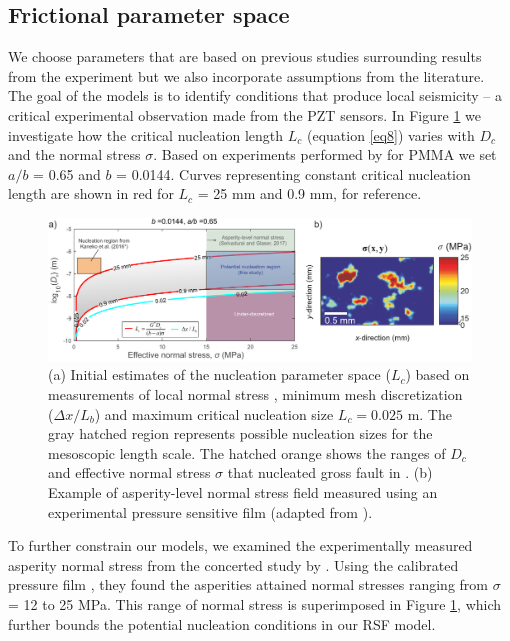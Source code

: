 \documentclass[preprint,1p, 10pt,authoryear]{elsarticle}
\begin{document}
\subsection{Frictional parameter space}
\label{ParameterSpace}
We choose parameters that are based on previous studies surrounding results from the experiment but we also incorporate assumptions from the literature. The goal of the models is to identify conditions that produce local seismicity -- a critical experimental observation made from the PZT sensors. In Figure \ref{fig4} we investigate how the critical nucleation length $L_{c}$ (equation \eqref{eq8}) varies with $D_{c}$ and the normal stress $\sigma$.  Based on experiments performed by \citet{Berthoude1999} for PMMA we set $a/b$ = 0.65 and $b$ = 0.0144. Curves representing constant critical nucleation length are shown in red for $L_{c}$ = 25 mm and 0.9 mm, for reference.   

\begin{figure}
	\centering
	\includegraphics[scale = 0.95]{FIG4.pdf} 
	\caption{(a) Initial estimates of the nucleation parameter space ($L_{c}$) based on measurements of local normal stress \citep{Selvadurai2017}, minimum mesh discretization ($\Delta x /L_{b}$) and maximum critical nucleation size $L_{c} = 0.025$ m. The gray hatched region represents possible nucleation sizes for the mesoscopic length scale.  The hatched orange shows the ranges of $D_{c}$ and effective normal stress $\sigma$ that nucleated gross fault in \citet[][, *$a/b$ = 0.6944]{Kaneko2016}. (b) Example of asperity-level normal stress field measured using an experimental pressure sensitive film (adapted from \citet{Selvadurai2017}).}
	\label{fig4}
\end{figure}

To further constrain our models, we examined the experimentally measured asperity normal stress from the concerted study by \citet{Selvadurai2017}. Using the calibrated pressure film \citep{Selvadurai2015}, they found the asperities attained normal stresses ranging from $\sigma$ = 12 to 25 MPa. This range of normal stress is superimposed in Figure \ref{fig4}, which further bounds the potential nucleation conditions in our RSF model.
\end{document}
